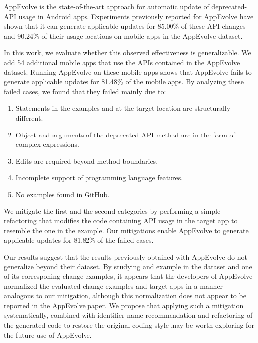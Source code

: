 AppEvolve is the state-of-the-art approach for automatic update of
deprecated-API usage in Android apps. Experiments previously reported for
AppEvolve have shown that it can generate applicable updates for
85.00\% of these API
changes and 90.24\% of their usage locations on mobile apps in the
AppEvolve dataset.

In this work, we evaluate whether this observed effectiveness is
generalizable. We add 54 additional mobile apps that use the APIs contained
in the AppEvolve dataset. Running AppEvolve on these mobile apps shows that
AppEvolve fails to generate applicable updates for 81.48\% of the mobile
apps. By analyzing these failed cases, we found that they failed mainly
due to:
\begin{enumerate}
    \item Statements in the examples and at the target location are structurally different.
    \item Object and arguments of the deprecated API method are in the form of complex expressions.
    \item Edits are required beyond method boundaries.
    \item Incomplete support of programming language features.
    \item No examples found in GitHub.
\end{enumerate}
We mitigate the first and the second categories by performing a simple
refactoring that modifies the code containing API usage in the target app
to resemble the one in the example. Our mitigations enable AppEvolve
to generate applicable updates for 81.82\% of the failed cases.

Our results suggest that the results previously obtained with AppEvolve do
not generalize beyond their dataset.  By studying and example in the
dataset and one of its corresponing change examples, it appears that the
developers of AppEvolve normalized the evaluated change examples and target
apps in a manner analogous to our mitigation, although this normalization
does not appear to be reported in the AppEvolve paper.  We propose that
applying such a mitigation systematically, combined with identifier name
recommendation and refactoring of the generated code to restore the
original coding style may be worth exploring for the future use of
AppEvolve.

